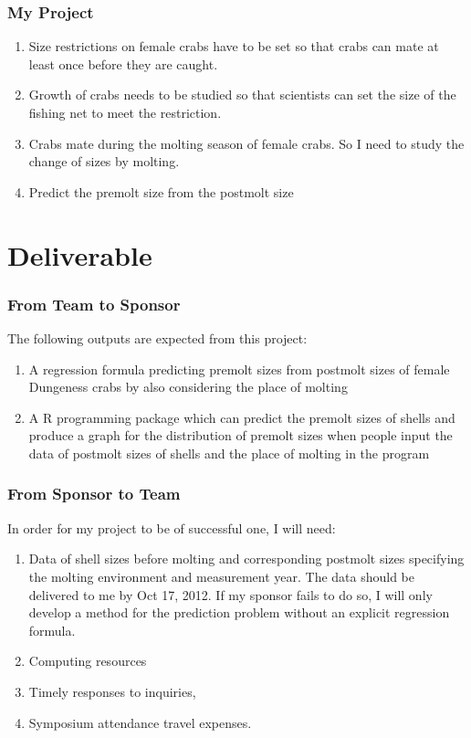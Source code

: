 \documentclass[compress,handout,10pt]{beamer}
\let\olditem\item
\renewcommand{\item}{\setlength{\itemsep}{0.5\baselineskip}\olditem}
\begin{document}
\begin{frame}
    \frametitle{My Project}
     \begin{enumerate}
         \item Size restrictions on female crabs have to be set so that crabs can mate at least once before they are caught.
         \item Growth of crabs needs to be studied so that scientists can set the size of the fishing net to meet the restriction.
         \item Crabs mate during the molting season of female crabs. So I need to study the change of sizes by molting.
         \item Predict the premolt size from the postmolt size
     \end{enumerate}
\end{frame}

\section{Deliverable}

\begin{frame}
    \frametitle{From Team to Sponsor}
    The following outputs are expected from this project:
     \begin{enumerate}
         \item A regression formula predicting premolt sizes from postmolt sizes of female Dungeness crabs by also considering the place of molting
         \item A R programming package which can predict the premolt sizes of shells and produce a graph for the distribution of premolt sizes when people input the data of postmolt sizes of shells and the place of molting in the program
     \end{enumerate}
\end{frame}

\begin{frame}
    \frametitle{From Sponsor to Team}
    In order for my project to be of successful one, I will need:
     \begin{enumerate}
         \item Data of shell sizes before molting and corresponding postmolt sizes specifying the molting environment and measurement year. The data should be delivered to me by Oct 17, 2012. If my sponsor fails to do so, I will only develop a method for the prediction problem without an explicit regression formula.
         \item Computing resources
         \item Timely responses to inquiries, 
         \item Symposium attendance travel expenses.
     \end{enumerate}
\end{frame}
\end{document}
